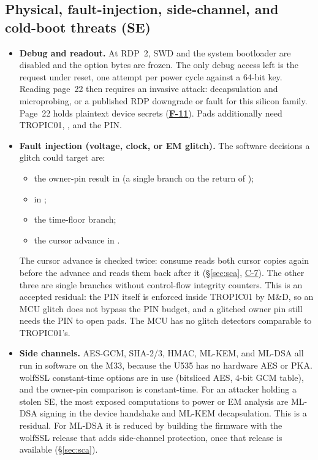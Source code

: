 \documentclass[11pt,a4paper]{article}
\newcommand{\fid}[1]{\textbf{#1}}
\begin{document}
\subsection{Physical, fault-injection, side-channel, and cold-boot threats (SE)}
\begin{itemize}
\item \textbf{Debug and readout.} At RDP~2, SWD and the system bootloader are disabled and the option bytes are frozen. The only debug access left is the  request under reset, one attempt per power cycle against a 64-bit key. Reading page~22 then requires an invasive attack: decapsulation and microprobing, or a published RDP downgrade or fault for this silicon family. Page~22 holds plaintext device secrets (\hyperref[f:F-11]{\fid{F-11}}). Pads additionally need TROPIC01, , and the PIN.
\item \textbf{Fault injection (voltage, clock, or EM glitch).} The software decisions a glitch could target are:
  \begin{itemize}
  \item the owner-pin result in  (a single branch on the return of );
  \item {} in ;
  \item the time-floor branch;
  \item the cursor advance in .
  \end{itemize}
  The cursor advance is checked twice: consume reads both cursor copies again before the advance and reads them back after it (\S\ref{sec:sca}, \hyperref[c:C-7]{C-7}). The other three are single branches without control-flow integrity counters. This is an accepted residual: the PIN itself is enforced inside TROPIC01 by M\&D, so an MCU glitch does not bypass the PIN budget, and a glitched owner pin still needs the PIN to open pads. The MCU has no glitch detectors comparable to TROPIC01's.
\item \textbf{Side channels.} AES-GCM, SHA-2/3, HMAC, ML-KEM, and ML-DSA all run in software on the M33, because the U535 has no hardware AES or PKA. wolfSSL constant-time options are in use (bitsliced AES, 4-bit GCM table), and the owner-pin comparison is constant-time. For an attacker holding a stolen SE, the most exposed computations to power or EM analysis are ML-DSA signing in the device handshake and ML-KEM decapsulation. This is a residual. For ML-DSA it is reduced by building the firmware with the wolfSSL release that adds side-channel protection, once that release is available (\S\ref{sec:sca}).

\end{itemize}
\end{document}
